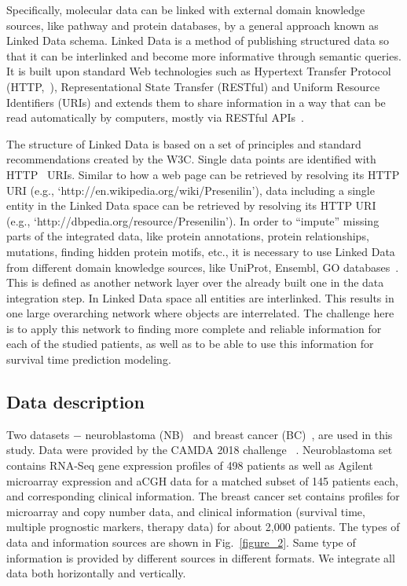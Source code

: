 \documentclass{bmcart}
\begin{document}
Specifically, molecular data can be linked with external domain
knowledge sources, like pathway and protein databases, by a general
approach known as Linked Data schema. Linked Data is a method of
publishing structured data so that it can be interlinked and become
more informative through semantic queries. It is built upon standard
Web technologies such as Hypertext Transfer Protocol (HTTP,~\cite{1}),
Representational State Transfer (RESTful) and Uniform Resource
Identifiers (URIs) and extends them to share information in a way that
can be read automatically by computers, mostly via RESTful APIs~\cite{12}. 

The structure of Linked Data is based on a set of principles and
standard recommendations created by the W3C. Single data points
are identified with HTTP~\cite{1} URIs. Similar to how a web page can be
retrieved by resolving its HTTP URI (e.g.,
{\textquoteleft}http://en.wikipedia.org/wiki/Presenilin{\textquoteright}),
data including a single entity in the Linked Data space can be
retrieved by resolving its HTTP URI (e.g.,
{\textquoteleft}http://dbpedia.org/resource/Presenilin{\textquoteright}).
In order to {\textquotedblleft}impute{\textquotedblright} missing parts
of the integrated data, like protein annotations, protein
relationships, mutations, finding hidden protein motifs, etc., it is
necessary to use Linked Data from different domain knowledge sources,
like UniProt, Ensembl, GO databases~\cite{36, 37}. This is defined as
another network layer over the already built one in the data
integration step. In Linked Data space all entities are interlinked.
This  results in one large overarching network where objects are
interrelated. The challenge here is to apply this network to finding
more complete and reliable information for each of the studied
patients, as well as to be able to use this information for survival
time prediction modeling.

\subsection{Data description}

Two datasets $-$ neuroblastoma (NB)~\cite{33} and breast cancer (BC)~\cite{32},
are used in this study. Data were provided by the CAMDA 2018 challenge~\cite{35}
. Neuroblastoma set contains RNA-Seq gene expression profiles of
498 patients as well as Agilent microarray expression and aCGH data for
a matched subset of 145 patients each, and corresponding clinical
information. The breast cancer set contains profiles for microarray and
copy number data, and clinical information (survival time, multiple
prognostic markers, therapy data) for about 2,000 patients. The types
of data and information sources are shown in Fig.~\ref{figure_2}. Same type of
information is provided by different sources in different formats. We
integrate all data both horizontally and vertically.
\end{document}
